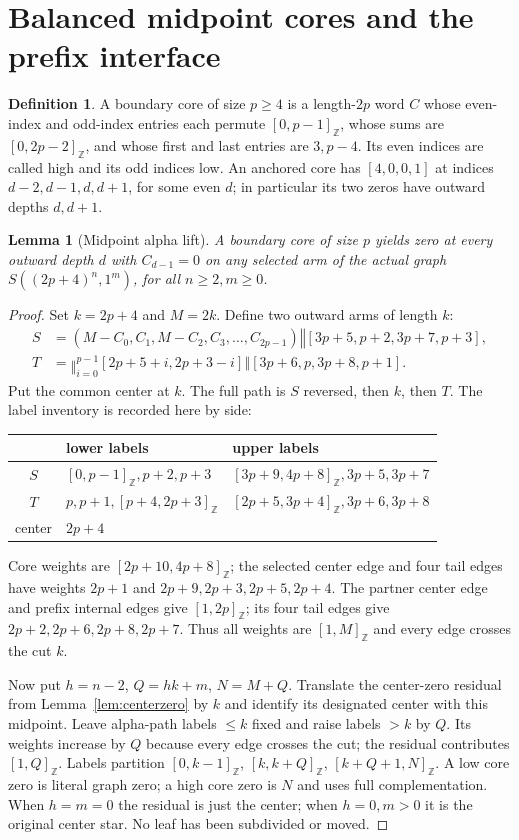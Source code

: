 \documentclass[11pt,a4paper]{article}
\newtheorem{lemma}[theorem]{Lemma}
\theoremstyle{definition}\newtheorem{definition}[theorem]{Definition}
\theoremstyle{remark}\newtheorem{remark}[theorem]{Remark}
\newcommand{\cat}{\mathbin{\Vert}}
\newcommand{\ints}[2]{[#1,#2]_{\mathbb Z}}
\begin{document}
\section{Balanced midpoint cores and the prefix interface}
\label{sec:cores}
\begin{definition}
A boundary core of size $p\ge4$ is a length-$2p$ word $C$ whose
even-index and odd-index entries each permute $\ints0{p-1}$,
whose sums are $\ints0{2p-2}$, and whose first and last entries are
$3,p-4$. Its even indices are called high and its odd indices low.
An anchored core has $[4,0,0,1]$ at indices $d-2,d-1,d,d+1$, for some
even $d$; in particular its two zeros have outward depths $d,d+1$.
\end{definition}

\begin{lemma}[Midpoint alpha lift]\label{lem:corelift}
A boundary core of size $p$ yields zero at every outward depth $d$ with
$C_{d-1}=0$ on any selected arm of the actual graph
$S((2p+4)^n,1^m)$, for all $n\ge2,m\ge0$.
\end{lemma}
\begin{proof}
Set $k=2p+4$ and $M=2k$. Define two outward arms of length $k$:
\begin{align*}
 S&=(M-C_0,C_1,M-C_2,C_3,\ldots,C_{2p-1})
       \cat[3p+5,p+2,3p+7,p+3],\\
 T&=\mathop{\cat}_{i=0}^{p-1}[2p+5+i,2p+3-i]
       \cat[3p+6,p,3p+8,p+1].
\end{align*}
Put the common center at $k$. The full path is $S$ reversed, then $k$,
then $T$. The label inventory is recorded here by side:
\begin{center}\begin{tabular}{c ll}\toprule
 & lower labels & upper labels\\\midrule
 $S$ & $\ints0{p-1},p+2,p+3$ & $\ints{3p+9}{4p+8},3p+5,3p+7$\\
 $T$ & $p,p+1,\ints{p+4}{2p+3}$ & $\ints{2p+5}{3p+4},3p+6,3p+8$\\
 center & $2p+4$ & \\\bottomrule\end{tabular}\end{center}
Core weights are $\ints{2p+10}{4p+8}$; the selected center edge and
four tail edges have weights $2p+1$ and $2p+9,2p+3,2p+5,2p+4$.
The partner center edge and prefix internal edges give $\ints1{2p}$;
its four tail edges give $2p+2,2p+6,2p+8,2p+7$. Thus all weights are
$\ints1M$ and every edge crosses the cut $k$.

Now put $h=n-2$, $Q=hk+m$, $N=M+Q$. Translate the
center-zero residual from Lemma~\ref{lem:centerzero} by $k$ and identify
its designated center with this midpoint. Leave alpha-path labels
$\le k$ fixed and raise labels $>k$ by $Q$. Its weights increase by
$Q$ because every edge crosses the cut; the residual contributes
$\ints1Q$. Labels partition $\ints0{k-1}$, $\ints k{k+Q}$,
$\ints{k+Q+1}N$. A low core zero is literal graph zero; a high core
zero is $N$ and uses full complementation. When $h=m=0$ the residual
is just the center; when $h=0,m>0$ it is the original center star.
No leaf has been subdivided or moved.
\end{proof}
\end{document}
